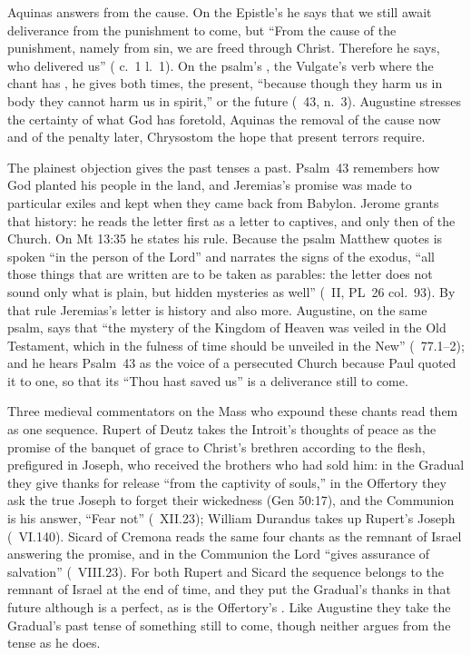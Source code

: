Aquinas answers from the cause. On the Epistle's  he says that
we still await deliverance from the punishment to come, but ``From the cause
of the punishment, namely from sin, we are freed through Christ. Therefore he
says, who delivered us'' ( c.~1 l.~1). On
the psalm's , the Vulgate's verb where the chant has
, he gives both times, the present, ``because
though they harm us in body they cannot harm us in spirit,'' or the future
(~43, n.~3). Augustine stresses the certainty of what God
has foretold, Aquinas the removal of the cause now and of the penalty later,
Chrysostom the hope that present terrors require.

The plainest objection gives the past tenses a past. Psalm~43 remembers how
God planted his people in the land, and Jeremias's promise was made to
particular exiles and kept when they came back from Babylon. Jerome grants
that history: he reads the letter first as a letter to captives, and only
then of the Church. On Mt 13:35 he states his rule. Because the psalm Matthew
quotes is spoken ``in the person of the Lord'' and narrates the signs of the
exodus, ``all those things that are written are to be taken as parables: the
letter does not sound only what is plain, but hidden mysteries as well''
(~II, PL~26 col.~93). By that rule Jeremias's letter is
history and also more. Augustine, on the same psalm, says that ``the mystery
of the Kingdom of Heaven was veiled in the Old Testament, which in the fulness
of time should be unveiled in the New'' (~77.1--2); and he
hears Psalm~43 as the voice of a persecuted Church because Paul quoted it to
one, so that its ``Thou hast saved us'' is a deliverance still to come.

Three medieval commentators on the Mass who expound these chants read them as
one sequence. Rupert of Deutz takes the Introit's thoughts of peace as the promise of the
banquet of grace to Christ's brethren according to the flesh, prefigured in
Joseph, who received the brothers who had sold him: in the Gradual they give thanks for release ``from the captivity of souls,''
in the Offertory they ask the true Joseph to forget their wickedness (Gen
50:17), and the Communion is his answer, ``Fear not'' (~XII.23); William Durandus takes up Rupert's Joseph
(~VI.140). Sicard of Cremona reads the same four chants as the
remnant of Israel answering the promise, and in the Communion the Lord ``gives
assurance of salvation'' (~VIII.23). For both Rupert and Sicard
the sequence belongs to the remnant of Israel at the end of time, and they put
the Gradual's thanks in that future although  is a perfect,
as is the Offertory's . Like Augustine they take the
Gradual's past tense of something still to come, though neither argues from
the tense as he does.

